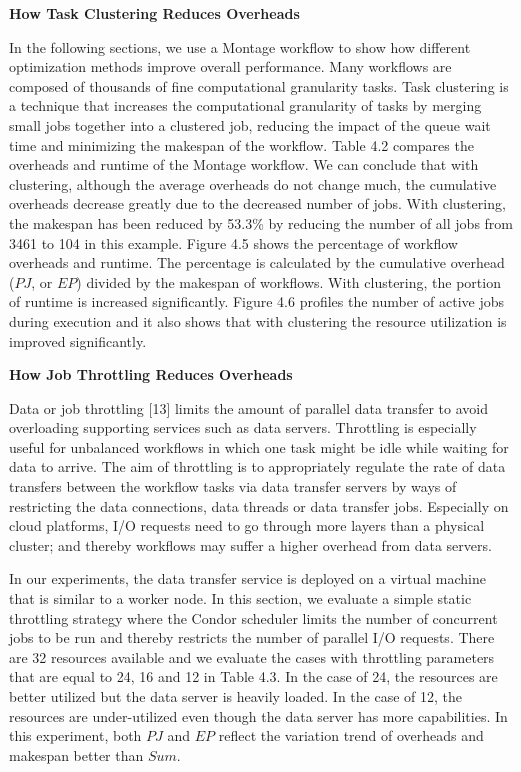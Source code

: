\textbf{How Task Clustering Reduces Overheads}

In the following sections, we use a Montage workflow to show how different optimization methods improve overall performance. Many workflows are composed of thousands of fine computational granularity tasks. Task clustering is a technique that increases the computational granularity of tasks by merging small jobs together into a clustered job, reducing the impact of the queue wait time and minimizing the makespan of the workflow. Table 4.2 compares the overheads and runtime of the Montage workflow. We can conclude that with clustering, although the average overheads do not change much, the cumulative overheads decrease greatly due to the decreased number of jobs. With clustering, the makespan has been reduced by 53.3\% by reducing the number of all jobs from 3461 to 104 in this example. Figure 4.5 shows the percentage of workflow overheads and runtime. The percentage is calculated by the cumulative overhead ($PJ$, or $EP$) divided by the makespan of workflows. With clustering, the portion of runtime is increased significantly. Figure 4.6 profiles the number of active jobs during execution and it also shows that with clustering the resource utilization is improved significantly. 

\textbf{How Job Throttling Reduces Overheads}

Data or job throttling [13] limits the amount of parallel data transfer to avoid overloading supporting services such as data servers. Throttling is especially useful for unbalanced workflows in which one task might be idle while waiting for data to arrive. The aim of throttling is to appropriately regulate the rate of data transfers between the workflow tasks via data transfer servers by ways of restricting the data connections, data threads or data transfer jobs. Especially on cloud platforms, I/O requests need to go through more layers than a physical cluster; and thereby workflows may suffer a higher overhead from data servers.

In our experiments, the data transfer service is deployed on a virtual machine that is similar to a worker node.  In this section, we evaluate a simple static throttling strategy where the Condor scheduler limits the number of concurrent jobs to be run and thereby restricts the number of parallel I/O requests. There are 32 resources available and we evaluate the cases with throttling parameters that are equal to 24, 16 and 12 in Table 4.3. In the case of 24, the resources are better utilized but the data server is heavily loaded. In the case of 12, the resources are under-utilized even though the data server has more capabilities. In this experiment, both $PJ$ and $EP$ reflect the variation trend of overheads and makespan better than $Sum$. 


